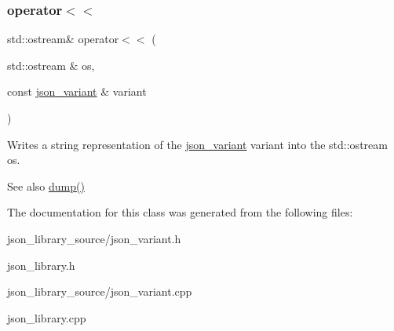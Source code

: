 \subsubsection{\texorpdfstring{operator$<$$<$}{operator<<}\hspace{0.1cm}{\footnotesize\ttfamily [2/2]}}
{\footnotesize\ttfamily std\+::ostream\& operator$<$$<$ (\begin{DoxyParamCaption}\item[{std\+::ostream \&}]{os,  }\item[{const \hyperlink{classJSONLIB__NAMESPACE_1_1json__variant}{json\+\_\+variant} \&}]{variant }\end{DoxyParamCaption})\hspace{0.3cm}{\ttfamily [friend]}}



Writes a string representation of the \hyperlink{classJSONLIB__NAMESPACE_1_1json__variant}{json\+\_\+variant} {\ttfamily variant} into the std\+::ostream {\ttfamily os}. 

\begin{DoxySeeAlso}{See also}
\hyperlink{classJSONLIB__NAMESPACE_1_1json__variant_a72d4a39d77b76f076354219edc6ea4a0}{dump()} 
\end{DoxySeeAlso}


The documentation for this class was generated from the following files\+:\begin{DoxyCompactItemize}
\item 
json\+\_\+library\+\_\+source/json\+\_\+variant.\+h\item 
json\+\_\+library.\+h\item 
json\+\_\+library\+\_\+source/json\+\_\+variant.\+cpp\item 
json\+\_\+library.\+cpp\end{DoxyCompactItemize}
